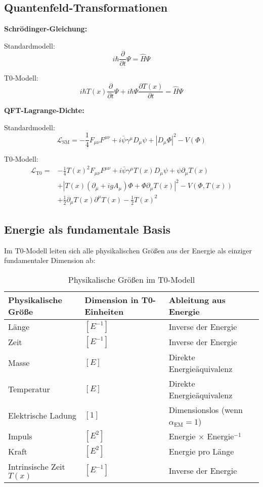 \documentclass[12pt,a4paper]{article}
\newcommand{\Tfield}{T(x)}
\newcommand{\alphaEM}{\alpha_{\text{EM}}}
\newcommand{\DhiggsT}{\Tfield (\partial_\mu + ig A_\mu) \Phi + \Phi \partial_\mu \Tfield}
\newcommand{\DcovT}[1]{\Tfield D_\mu #1 + #1 \partial_\mu \Tfield}
\begin{document}
	\subsection{Quantenfeld-Transformationen}
	
	\textbf{Schrödinger-Gleichung:}
	
	Standardmodell:
	\[ i \hbar \frac{\partial}{\partial t} \Psi = \hat{H} \Psi \]
	
	T0-Modell:
	\[ i \hbar \Tfield \frac{\partial}{\partial t} \Psi + i \hbar \Psi \frac{\partial \Tfield}{\partial t} = \hat{H} \Psi \]
	
	\textbf{QFT-Lagrange-Dichte:}
	
	Standardmodell:
	\[ \mathcal{L}_{\text{SM}} = -\frac{1}{4} F_{\mu\nu} F^{\mu\nu} + i \bar{\psi} \gamma^\mu D_\mu \psi + |D_\mu \Phi|^2 - V(\Phi) \]
	
	T0-Modell:
	\begin{align}
		\mathcal{L}_{\text{T0}} = &-\frac{1}{4} \Tfield^2 F_{\mu\nu} F^{\mu\nu} + i \bar{\psi} \gamma^\mu \DcovT{\psi} \nonumber \\
		&+ |\DhiggsT|^2 - V(\Phi, \Tfield) \nonumber \\
		&+ \frac{1}{2} \partial_\mu \Tfield \partial^\mu \Tfield - \frac{1}{2} \Tfield^2
	\end{align}
	
	\subsection{Energie als fundamentale Basis}
	
	Im T0-Modell leiten sich alle physikalischen Größen aus der Energie als einziger fundamentaler Dimension ab:
	
	\begin{table}[h]
		\centering
		\begin{tabular}{>{\RaggedRight}p{} >{\RaggedRight}p{} >{\RaggedRight}p{}}
			\toprule
			\textbf{Physikalische Größe} & \textbf{Dimension in T0-Einheiten} & \textbf{Ableitung aus Energie} \\
			\midrule
			Länge & $[E^{-1}]$ & Inverse der Energie \\
			Zeit & $[E^{-1}]$ & Inverse der Energie \\
			Masse & $[E]$ & Direkte Energieäquivalenz \\
			Temperatur & $[E]$ & Direkte Energieäquivalenz \\
			Elektrische Ladung & $[1]$ & Dimensionslos (wenn $\alphaEM = 1$) \\
			Impuls & $[E^2]$ & Energie $\times$ Energie$^{-1}$ \\
			Kraft & $[E^2]$ & Energie pro Länge \\
			Intrinsische Zeit $\Tfield$ & $[E^{-1}]$ & Inverse der Energie \\
			\bottomrule
		\end{tabular}
		\caption{Physikalische Größen im T0-Modell}
	\end{table}
	
\end{document}

